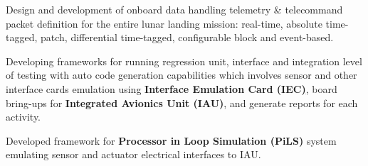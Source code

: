 \begin{cventries}
{\begin{cvitems}
		\end{cvitems}
	}
    \cventry
    {}
	{}
	{}
	{}
	{
		\begin{cvitems}
		     \item{\large Design and development of onboard data handling telemetry \& telecommand packet definition for the entire lunar landing mission: real-time, absolute time-tagged, patch, differential time-tagged, configurable block and event-based.}
			\item{\large Developing frameworks for running regression unit, interface and integration level of testing with auto code generation capabilities which involves sensor and other interface cards emulation using \textbf{Interface Emulation Card (IEC)}\href{http://zedboard.org/product/microzed/}, board bring-ups for \textbf{Integrated Avionics Unit (IAU)}, and generate reports for each activity.}
			\item{\large Developed framework for \textbf{Processor in Loop Simulation (PiLS)} system emulating sensor and actuator electrical interfaces to IAU.}
		\end{cvitems}
	}

\end{cventries}
